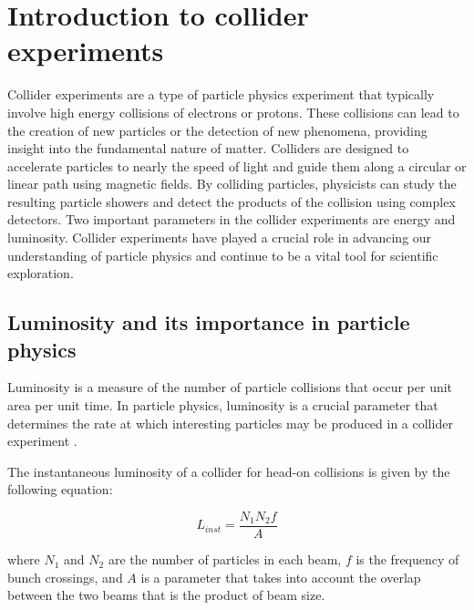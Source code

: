 \chapter{Introduction to collider experiments}  %

\ifpdf
    \graphicspath{{Chapter1/Figs/Raster/}{Chapter1/Figs/PDF/}{Chapter1/Figs/}}
\else
    \graphicspath{{Chapter1/Figs/Vector/}{Chapter1/Figs/}}
\fi


Collider experiments are a type of particle physics experiment that typically involve high energy collisions of electrons or protons. %
These collisions can lead to the creation of new particles or the detection of new phenomena, providing insight into the fundamental nature of matter. Colliders are designed to accelerate particles to nearly the speed of light and guide them along a circular or linear path using magnetic fields. By colliding particles, physicists can study the resulting particle showers and detect the products of the collision using complex detectors. Two important parameters in the collider experiments are energy and luminosity. Collider experiments have played a crucial role in advancing our understanding of particle physics and continue to be a vital tool for scientific exploration. 

\section{Luminosity and its importance in particle physics}

Luminosity is a measure of the number of particle collisions that occur per unit area per unit time. In particle physics, luminosity is a crucial parameter that determines the rate at which interesting particles may be produced in a collider experiment \cite{Herr:941318}.

The instantaneous luminosity of a collider for head-on collisions is given by the following equation:

\begin{equation}
L_{inst} = \frac{N_1 N_2 f}{A} 
\end{equation}

where $N_1$ and $N_2$ are the number of particles in each beam, $f$ is the frequency of bunch crossings, and $A$ is a parameter that takes into account the overlap between the two beams that is the product of beam size.

